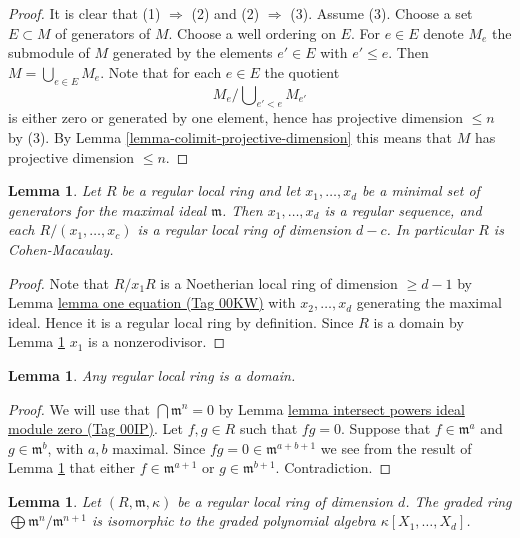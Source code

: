 \documentclass{amsart}
\theoremstyle{plain}
\newtheorem{lemma}[subsection]{Lemma}
\theoremstyle{definition}
\theoremstyle{remark}
\numberwithin{equation}{subsection}
\begin{document}
\begin{proof}
It is clear that (1) $\Rightarrow$ (2) and (2) $\Rightarrow$ (3).
Assume (3). Choose a set $E \subset M$ of generators of $M$.
Choose a well ordering on $E$. For $e \in E$ denote
$M_e$ the submodule of $M$ generated by the elements $e' \in E$
with $e' \leq e$. Then $M = \bigcup_{e \in E} M_e$.
Note that for each $e \in E$ the quotient
$$
M_e/\bigcup\nolimits_{e' < e} M_{e'}
$$
is either zero or generated by one element, hence has projective
dimension $\leq n$ by (3). By Lemma \ref{lemma-colimit-projective-dimension}
this means that $M$ has projective dimension $\leq n$.
\end{proof}


\begin{lemma}
\label{lemma-regular-ring-CM}
Let $R$ be a regular local ring and let
$x_1, \ldots, x_d$ be a minimal set of generators
for the maximal ideal $\mathfrak m$. Then
$x_1, \ldots, x_d$ is a regular sequence, and
each $R/(x_1, \ldots, x_c)$ is a regular local ring
of dimension $d - c$. In particular $R$ is Cohen-Macaulay.
\end{lemma}

\begin{proof}
Note that $R/x_1R$ is a Noetherian local ring of dimension $\geq d - 1$
by Lemma \href{https://stacks.math.columbia.edu/tag/00KW}{lemma one equation (Tag 00KW)} with $x_2, \ldots, x_d$
generating the maximal ideal. Hence it is a regular local ring by definition.
Since $R$ is a domain by Lemma \ref{lemma-regular-domain}
$x_1$ is a nonzerodivisor.
\end{proof}


\begin{lemma}
\label{lemma-regular-domain}
Any regular local ring is a domain.
\end{lemma}

\begin{proof}
We will use that $\bigcap \mathfrak m^n = 0$
by Lemma \href{https://stacks.math.columbia.edu/tag/00IP}{lemma intersect powers ideal module zero (Tag 00IP)}.
Let $f, g \in R$ such that $fg = 0$.
Suppose that $f \in \mathfrak m^a$ and
$g \in \mathfrak m^b$, with $a, b$ maximal.
Since $fg = 0 \in \mathfrak m^{a + b + 1}$
we see from the result of Lemma \ref{lemma-regular-graded}
that either $f \in \mathfrak m^{a + 1}$ or
$g \in \mathfrak m^{b + 1}$. Contradiction.
\end{proof}


\begin{lemma}
\label{lemma-regular-graded}
Let $(R, \mathfrak m, \kappa)$ be a regular local ring of dimension $d$.
The graded ring $\bigoplus \mathfrak m^n / \mathfrak m^{n + 1}$
is isomorphic to the graded polynomial algebra
$\kappa[X_1, \ldots, X_d]$.
\end{lemma}
\end{document}
